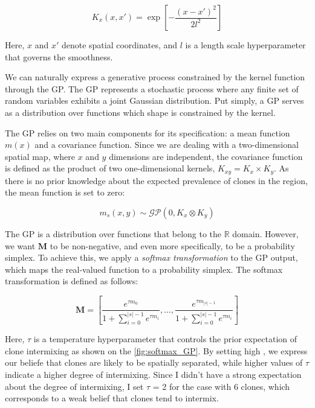 \begin{equation}
    K_x(x,x') = \exp\left[ -\dfrac{(x-x')^2}{2l^2}\right]
\end{equation}

Here, $x$ and $x'$ denote spatial coordinates, and $l$ is a length scale hyperparameter that governs the smoothness.

We can naturally express a generative process constrained by the kernel function through the \acf{GP}. The \ac{GP} represents a stochastic process where any finite set of random variables exhibits a joint Gaussian distribution. Put simply, a \ac{GP} serves as a distribution over functions which shape is constrained by the kernel. 

The \ac{GP} relies on two main components for its specification: a mean function $m(x)$ and a covariance function. Since we are dealing with a two-dimensional spatial map, where $x$ and $y$ dimensions are independent, the covariance function is defined as the product of two one-dimensional kernels, $K_{xy} = K_x \times K_y$. As there is no prior knowledge about the expected prevalence of clones in the region, the mean function is set to zero:

\begin{equation}
    m_s(x,y) \sim \mathcal{GP}(0, K_x \otimes K_y)
\end{equation}

The \ac{GP} is a distribution over functions that belong to the $\mathbb{R}$ domain. However, 
we want $\mathbf{M}$ to be non-negative, and even more specifically, to be a probability simplex. To achieve this, we apply a \emph{softmax transformation} to the \ac{GP} output, which maps the real-valued function to a probability simplex. The softmax transformation is defined as follows:

\begin{equation}
    \mathbf{M} = \left[ \dfrac{e^{\tau m_0}}{1 + \sum_{i=0}^{|s|-1}{e^{\tau m_i}}}, \dots, \dfrac{e^{\tau m_{|s|-1}}}{1 + \sum_{i=0}^{|s|-1}{e^{\tau m_i}}} \right]
\end{equation}

Here, $\tau$ is a temperature hyperparameter that controls the prior expectation of clone intermixing as shown on the \cref{fig:softmax_GP}. By setting high , we express our beliefe that clones are likely to be spatially separated, while higher values of $\tau$ indicate a higher degree of intermixing. Since I didn't have a strong expectation about the degree of intermixing, I set $\tau$ = 2 for the case with 6 clones, which corresponds to a weak belief that clones tend to intermix.

